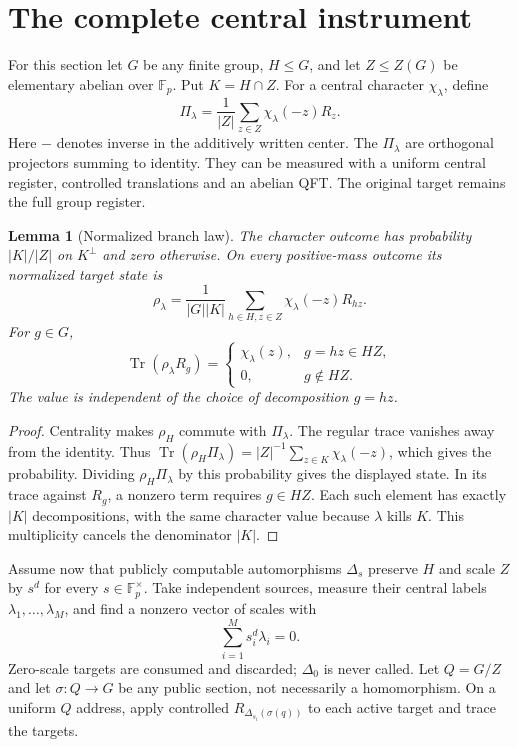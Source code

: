 \documentclass[11pt]{article}
\newtheorem{lemma}[theorem]{Lemma}
\theoremstyle{remark}
\newcommand{\Fp}{\mathbb F_p}
\newcommand{\tr}{\operatorname{Tr}}
\begin{document}
\section{The complete central instrument}
For this section let $G$ be any finite group, $H\le G$, and let
$Z\le Z(G)$ be elementary abelian over $\Fp$. Put $K=H\cap Z$.
For a central character $\chi_\lambda$, define
\[
 \Pi_\lambda=\frac1{|Z|}\sum_{z\in Z}\chi_\lambda(-z)R_z.
\]
Here $-$ denotes inverse in the additively written center.
The $\Pi_\lambda$ are orthogonal projectors summing to identity. They
can be measured with a uniform central register, controlled translations
and an abelian QFT. The original target remains the full group register.

\begin{lemma}[Normalized branch law]\label{lem:central}
The character outcome has probability $|K|/|Z|$ on $K^\perp$ and zero
otherwise. On every positive-mass outcome its normalized target state is
\[
 \rho_\lambda=\frac1{|G||K|}
       \sum_{h\in H,z\in Z}\chi_\lambda(-z)R_{hz}.
\]
For $g\in G$,
\[
 \tr(\rho_\lambda R_g)=
 \begin{cases}\chi_\lambda(z),&g=hz\in HZ,\\0,&g\notin HZ.\end{cases}
\]
The value is independent of the choice of decomposition $g=hz$.
\end{lemma}
\begin{proof}
Centrality makes $\rho_H$ commute with $\Pi_\lambda$.
The regular trace vanishes away from the identity. Thus
$\tr(\rho_H\Pi_\lambda)=|Z|^{-1}\sum_{z\in K}\chi_\lambda(-z)$,
which gives the probability. Dividing $\rho_H\Pi_\lambda$ by this
probability gives the displayed state. In its trace against $R_g$, a
nonzero term requires $g\in HZ$. Each such element has exactly $|K|$
decompositions, with the same character value because $\lambda$ kills
$K$. This multiplicity cancels the denominator $|K|$.
\end{proof}

Assume now that publicly computable automorphisms $\Delta_s$ preserve
$H$ and scale $Z$ by $s^d$ for every $s\in\Fp^\times$.
Take independent sources, measure their central labels
$\lambda_1,\ldots,\lambda_M$, and find a nonzero vector of scales with
\begin{equation}\label{eq:sde}
 \sum_{i=1}^M s_i^d\lambda_i=0.
\end{equation}
Zero-scale targets are consumed and discarded; $\Delta_0$ is never called.
Let $Q=G/Z$ and let $\sigma:Q\to G$ be any public section, not necessarily
a homomorphism. On a uniform $Q$ address, apply controlled
$R_{\Delta_{s_i}(\sigma(q))}$ to each active target and trace the targets.
\end{document}
